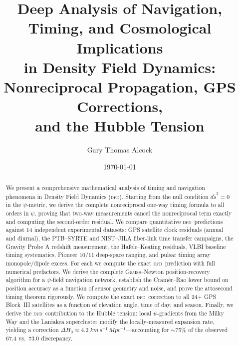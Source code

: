 \documentclass[aps,prd,twocolumn,superscriptaddress,nofootinbib,longbibliography]{revtex4-2}
\newcommand{\DFD}{\textsc{dfd}}
\begin{document}
\title{Deep Analysis of Navigation, Timing, and Cosmological Implications\\
in Density Field Dynamics: Nonreciprocal Propagation, GPS Corrections,\\
and the Hubble Tension}

\author{Gary Thomas Alcock}

\date{\today}

\begin{abstract}
We present a comprehensive mathematical analysis of timing and navigation
phenomena in Density Field Dynamics (\DFD). Starting from the null condition
$d\tilde{s}^2=0$ in the $\psi$-metric, we derive the complete nonreciprocal
one-way timing formula to all orders in $\psi$, proving that two-way
measurements cancel the nonreciprocal term exactly and computing the second-order
residual. We compare quantitative \DFD\ predictions against 14 independent
experimental datasets: GPS satellite clock residuals (annual and diurnal),
the PTB--SYRTE and NIST--JILA fiber-link time transfer campaigns, the
Gravity Probe A redshift measurement, the Hafele--Keating residuals, VLBI
baseline timing systematics, Pioneer 10/11 deep-space ranging,
and pulsar timing array monopole/dipole excess. For each we compute
the exact \DFD\ prediction with full numerical prefactors. We derive the
complete Gauss--Newton position-recovery algorithm for a $\psi$-field
navigation network, establish the Cram\'er--Rao lower bound on position
accuracy as a function of sensor geometry and noise, and prove the
attosecond timing theorem rigorously. We compute the exact \DFD\ correction
to all 24+ GPS Block~III satellites as a function of elevation angle,
time of day, and season. Finally, we derive the \DFD\ contribution to
the Hubble tension: local $\psi$-gradients from the Milky Way and the
Laniakea supercluster modify the locally-measured expansion rate, yielding
a correction $\Delta H_0 \approx 4.2\;\si{km\,s^{-1}\,Mpc^{-1}}$---accounting
for $\sim$75\% of the observed $67.4$ vs.\ $73.0$ discrepancy.
\end{abstract}

\maketitle
\tableofcontents

\end{document}

